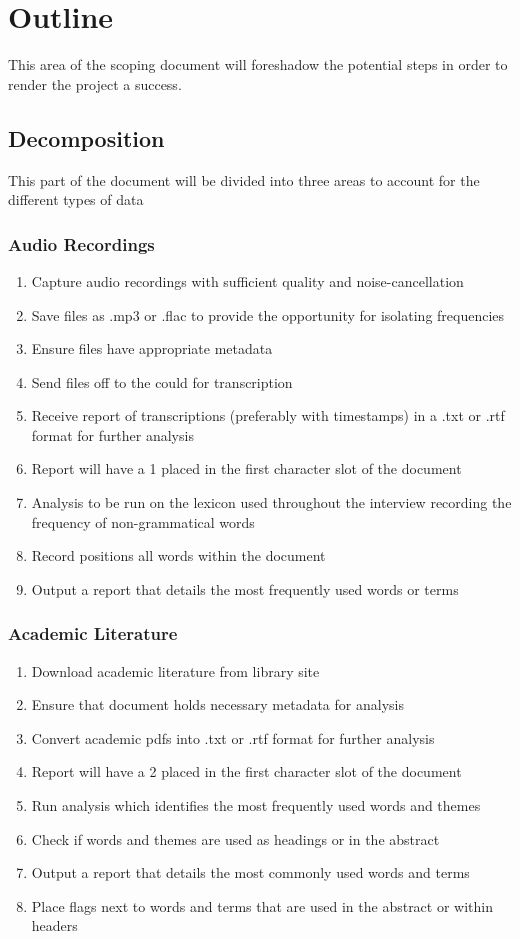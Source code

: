 \documentclass{article}
\begin{document}
\newpage

\section{Outline}
This area of the scoping document will foreshadow the potential steps in order to render the project a success.
\subsection{Decomposition}
This part of the document will be divided into three areas to account for the different types of data
\subsubsection{Audio Recordings}
\begin{enumerate}
    \item Capture audio recordings with sufficient quality and noise-cancellation
    \item Save files as .mp3 or .flac to provide the opportunity for isolating frequencies
    \item Ensure files have appropriate metadata
    \item Send files off to the could for transcription
    \item Receive report of transcriptions (preferably with timestamps) in a .txt or .rtf format for further analysis
    \item Report will have a 1 placed in the first character slot of the document
    \item Analysis to be run on the lexicon used throughout the interview recording the frequency of non-grammatical words
    \item Record positions all words within the document
    \item Output a report that details the most frequently used words or terms
\end{enumerate}
\subsubsection{Academic Literature}
\begin{enumerate}
    \item Download academic literature from library site
    \item Ensure that document holds necessary metadata for analysis
    \item Convert academic pdfs into .txt or .rtf format for further analysis
    \item Report will have a 2 placed in the first character slot of the document
    \item Run analysis which identifies the most frequently used words and themes
    \item Check if words and themes are used as headings or in the abstract
    \item Output a report that details the most commonly used words and terms
    \item Place flags next to words and terms that are used in the abstract or within headers
\end{enumerate}
\end{document}
